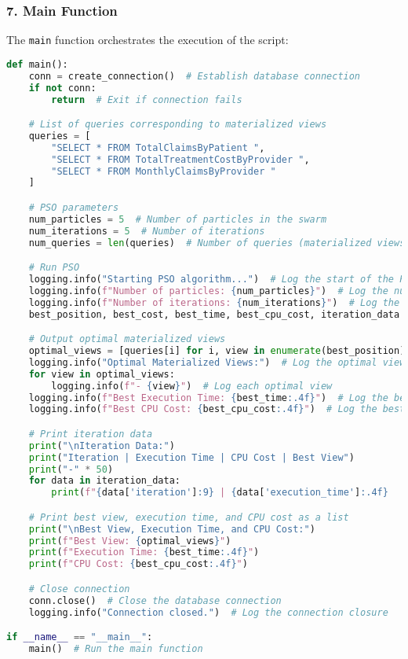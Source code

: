 \subsubsection*{7. Main Function}
The \texttt{main} function orchestrates the execution of the script:
\begin{lstlisting}[language=Python]
def main():
    conn = create_connection()  # Establish database connection
    if not conn:
        return  # Exit if connection fails

    # List of queries corresponding to materialized views
    queries = [
        "SELECT * FROM TotalClaimsByPatient ",
        "SELECT * FROM TotalTreatmentCostByProvider ",
        "SELECT * FROM MonthlyClaimsByProvider " 
    ]

    # PSO parameters
    num_particles = 5  # Number of particles in the swarm
    num_iterations = 5  # Number of iterations
    num_queries = len(queries)  # Number of queries (materialized views) to optimize

    # Run PSO
    logging.info("Starting PSO algorithm...")  # Log the start of the PSO algorithm
    logging.info(f"Number of particles: {num_particles}")  # Log the number of particles
    logging.info(f"Number of iterations: {num_iterations}")  # Log the number of iterations
    best_position, best_cost, best_time, best_cpu_cost, iteration_data = pso(num_particles, num_iterations, num_queries, queries, conn)

    # Output optimal materialized views
    optimal_views = [queries[i] for i, view in enumerate(best_position) if view == 1]  # Get optimal views
    logging.info("Optimal Materialized Views:")  # Log the optimal views
    for view in optimal_views:
        logging.info(f"- {view}")  # Log each optimal view
    logging.info(f"Best Execution Time: {best_time:.4f}")  # Log the best execution time
    logging.info(f"Best CPU Cost: {best_cpu_cost:.4f}")  # Log the best CPU cost

    # Print iteration data
    print("\nIteration Data:")
    print("Iteration | Execution Time | CPU Cost | Best View")
    print("-" * 50)
    for data in iteration_data:
        print(f"{data['iteration']:9} | {data['execution_time']:.4f}       | {data['cpu_cost']:.4f}   | {', '.join(data['best_view'])}")

    # Print best view, execution time, and CPU cost as a list
    print("\nBest View, Execution Time, and CPU Cost:")
    print(f"Best View: {optimal_views}")
    print(f"Execution Time: {best_time:.4f}")
    print(f"CPU Cost: {best_cpu_cost:.4f}")

    # Close connection
    conn.close()  # Close the database connection
    logging.info("Connection closed.")  # Log the connection closure

if __name__ == "__main__":
    main()  # Run the main function
\end{lstlisting}\vspace{.4cm}

